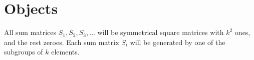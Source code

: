 \documentclass[a4paper]{article}
\begin{document}
\section{Objects}
\label{sec:objects}

All sum matrices $S_1, S_2, S_3, \ldots$ will be symmetrical square matrices with $k^2$ ones, and the rest zeroes.
Each sum matrix $S_i$ will be generated by one of the subgroups of $k$ elements.




\begin{comment}
The program contains three matrix-type objects, which we call $O$ (for occurrences),
$P$ (for pairs), 
and $R$ (for results).
They are described in turn.

\subsection{O: occurrences}
\label{ssec:occurr}

This object is a two-dimensional matrix with two rows and $n$ columns.
$O$ tracks two counts of occurrences associated to each of the $n$ elements.
Table~\ref{tab:O_0} shows the initial state of $O$.
Of course, all the occurrences are equal to $0$ at this point.
Note that $O$ has two rows:
In row 0 of $O$ ($O[0,]$), all the occurrences of element $i$ in $R$ (see section~\ref{ssect:R}) are counted.
In row 1 ($O[1,]$) we count in how many of the $n-1$ pairs in which an element can appear, it has already appeared.
(NB: We do not count the pair of an element with itself.)

\begin{table}
\centering
\begin{tabular} {| l ||c |c |c |c |c |c |c |c |c |c |}  
\multicolumn{ 11 }{c}{O (occurrences) } \\  
\multicolumn{1}{l}{index} & \multicolumn{1}{c}{0} & \multicolumn{1}{c}{1} & \multicolumn{1}{c}{2} & \multicolumn{1}{c}{3} & \multicolumn{1}{c}{4} & \multicolumn{1}{c}{5} & \multicolumn{1}{c}{6} & \multicolumn{1}{c}{7} & \multicolumn{1}{c}{\ldots} & \multicolumn{1}{c}{$n-1$} \\ \hline 
occurr & 0 & 0 & 0 & 0 & 0 & 0 & 0 & 0 & \ldots & 0 \\ \hline 
occurrInPairs & 0 & 0 & 0 & 0 & 0 & 0 & 0 & 0 & \ldots & 0 \\ \hline 
\end{tabular}  
\caption{
Row 1 (\emph{occurr}) shows how often element $i$ has occurred in a subgroup;
row 2 (\emph{occurrInPairs}) shows how many pairs have been formed with $i$.
(Note that the index is included in this table only for the convenience of the reader; however, it is not part of the object and therefore we do not count it as a row.)
}
\label{tab:O_0}
\end{table}


\end{comment}
\end{document}
